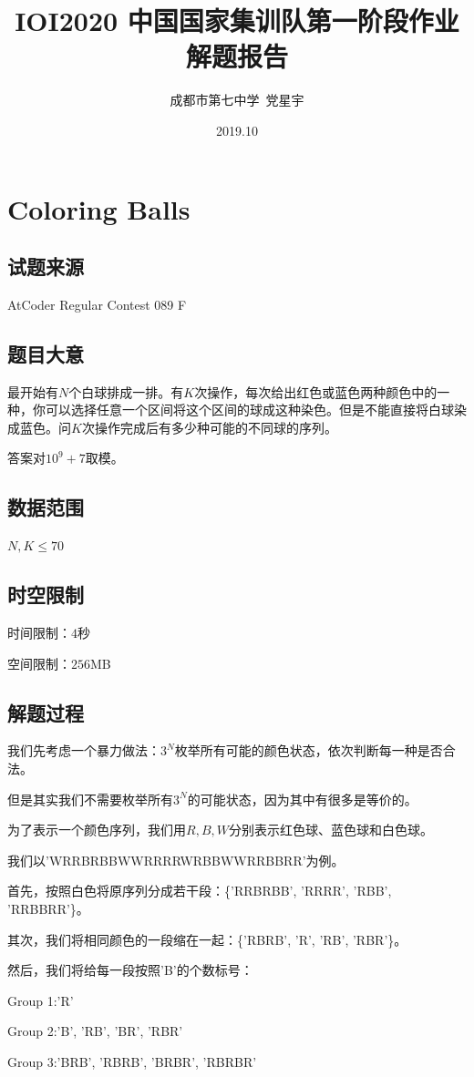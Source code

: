 \documentclass[12pt]{article}
\title{IOI2020 中国国家集训队第一阶段作业\\解题报告}
\author{成都市第七中学\ 党星宇}
\date{2019.10}
\begin{document}
\maketitle

\newpage

\section{Coloring Balls}
\subsection{试题来源}
AtCoder Regular Contest 089 F
\subsection{题目大意}
最开始有$N$个白球排成一排。有$K$次操作，每次给出红色或蓝色两种颜色中的一种，你可以选择任意一个区间将这个区间的球成这种染色。但是不能直接将白球染成蓝色。问$K$次操作完成后有多少种可能的不同球的序列。

答案对$10^9+7$取模。
\subsection{数据范围}
$N,K\le 70$
\subsection{时空限制}
时间限制：$4$秒

空间限制：$256$MB
\subsection{解题过程}
我们先考虑一个暴力做法：$3^N$枚举所有可能的颜色状态，依次判断每一种是否合法。

但是其实我们不需要枚举所有$3^N$的可能状态，因为其中有很多是等价的。

为了表示一个颜色序列，我们用$R,B,W$分别表示红色球、蓝色球和白色球。

我们以'WRRBRBBWWRRRRWRBBWWRRBBRR'为例。

首先，按照白色将原序列分成若干段：\{'RRBRBB', 'RRRR', 'RBB', 'RRBBRR'\}。

其次，我们将相同颜色的一段缩在一起：\{'RBRB', 'R', 'RB', 'RBR'\}。

然后，我们将给每一段按照'B'的个数标号：

Group 1:'R'

Group 2:'B', 'RB', 'BR', 'RBR'

Group 3:'BRB', 'RBRB', 'BRBR', 'RBRBR'
\end{document}
